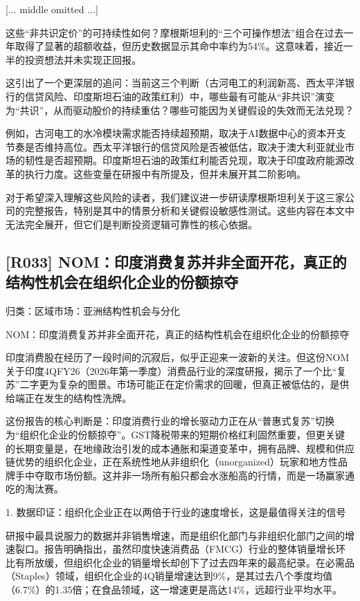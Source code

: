\documentclass[11pt]{ctexart}
\begin{document}
[... middle omitted ...]

这些“非共识定价”的可持续性如何？摩根斯坦利的“三个可操作想法”组合在过去一年取得了显著的超额收益，但历史数据显示其命中率约为54\%。这意味着，接近一半的投资想法并未实现正回报。

这引出了一个更深层的追问：当前这三个判断（古河电工的利润新高、西太平洋银行的信贷风险、印度斯坦石油的政策红利）中，哪些最有可能从“非共识”演变为“共识”，从而驱动股价的持续重估？哪些可能因为关键假设的失效而无法兑现？

例如，古河电工的水冷模块需求能否持续超预期，取决于AI数据中心的资本开支节奏是否维持高位。西太平洋银行的信贷风险是否被低估，取决于澳大利亚就业市场的韧性是否超预期。印度斯坦石油的政策红利能否兑现，取决于印度政府能源改革的执行力度。这些变量在研报中有所提及，但并未展开其二阶影响。

对于希望深入理解这些风险的读者，我们建议进一步研读摩根斯坦利关于这三家公司的完整报告，特别是其中的情景分析和关键假设敏感性测试。这些内容在本文中无法完全展开，但它们是判断投资逻辑可靠性的核心依据。

\subsection{[R033] NOM：印度消费复苏并非全面开花，真正的结构性机会在组织化企业的份额掠夺}
{\small\color{refgray}归类：区域市场：亚洲结构性机会与分化}

NOM：印度消费复苏并非全面开花，真正的结构性机会在组织化企业的份额掠夺

印度消费股在经历了一段时间的沉寂后，似乎正迎来一波新的关注。但这份NOM关于印度4QFY26（2026年第一季度）消费品行业的深度研报，揭示了一个比“复苏”二字更为复杂的图景。市场可能正在定价需求的回暖，但真正被低估的，是供给端正在发生的结构性洗牌。

这份报告的核心判断是：印度消费行业的增长驱动力正在从“普惠式复苏”切换为“组织化企业的份额掠夺”。GST降税带来的短期价格红利固然重要，但更关键的长期变量是，在地缘政治引发的成本通胀和渠道变革中，拥有品牌、规模和供应链优势的组织化企业，正在系统性地从非组织化（unorganized）玩家和地方性品牌手中夺取市场份额。这并非一场所有船只都会水涨船高的行情，而是一场赢家通吃的淘汰赛。

1. 数据印证：组织化企业正在以两倍于行业的速度增长，这是最值得关注的信号

研报中最具说服力的数据并非销售增速，而是组织化部门与非组织化部门之间的增速裂口。报告明确指出，虽然印度快速消费品（FMCG）行业的整体销量增长环比有所放缓，但组织化企业的销量增长却创下了过去四年来的最高纪录。在必需品（Staples）领域，组织化企业的4Q销量增速达到9\%，是其过去八个季度均值（6.7\%）的1.35倍；在食品领域，这一增速更是高达14\%，远超行业平均水平。
\end{document}
